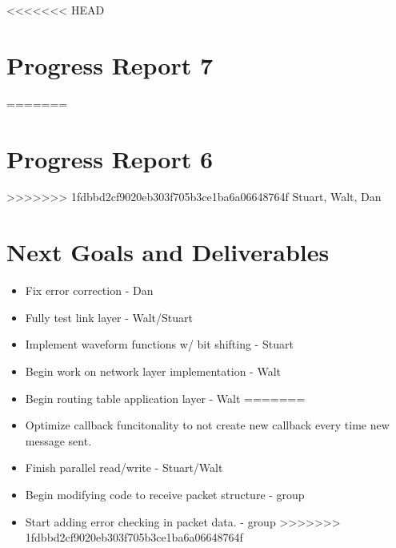 \documentclass{article}
\begin{document}
<<<<<<< HEAD
\section*{Progress Report 7}
=======
\section*{Progress Report 6}
>>>>>>> 1fdbbd2cf9020eb303f705b3ce1ba6a06648764f
Stuart, Walt, Dan

\section*{Next Goals and Deliverables}
\begin{itemize}
<<<<<<< HEAD
    \item Fix error correction - Dan
    \item Fully test link layer - Walt/Stuart
    \item Implement waveform functions w/ bit shifting - Stuart
    \item Begin work on network layer implementation - Walt
    \item Begin routing table application layer - Walt
=======
    \item Optimize callback funcitonality to not create new callback every time new message sent.

    \item Finish parallel read/write - Stuart/Walt
    \item Begin modifying code to receive packet structure - group
    \item Start adding error checking in packet data. - group
>>>>>>> 1fdbbd2cf9020eb303f705b3ce1ba6a06648764f
\end{itemize}

\end{document}
